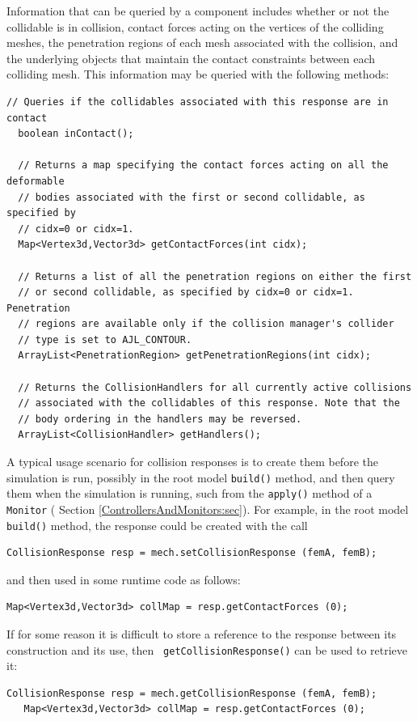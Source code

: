 Information that can be queried by a
 component
includes whether or not the collidable is in collision, contact
forces acting on the vertices of the colliding meshes, the
penetration regions of each mesh associated with the collision, and
the underlying 
objects that maintain the contact constraints between each colliding
mesh. This information may be queried with the following methods:
%
\begin{lstlisting}[]
  // Queries if the collidables associated with this response are in contact
  boolean inContact(); 

  // Returns a map specifying the contact forces acting on all the deformable 
  // bodies associated with the first or second collidable, as specified by
  // cidx=0 or cidx=1.
  Map<Vertex3d,Vector3d> getContactForces(int cidx);

  // Returns a list of all the penetration regions on either the first
  // or second collidable, as specified by cidx=0 or cidx=1. Penetration
  // regions are available only if the collision manager's collider
  // type is set to AJL_CONTOUR.
  ArrayList<PenetrationRegion> getPenetrationRegions(int cidx);

  // Returns the CollisionHandlers for all currently active collisions
  // associated with the collidables of this response. Note that the
  // body ordering in the handlers may be reversed.
  ArrayList<CollisionHandler> getHandlers();
\end{lstlisting}
%

A typical usage scenario for collision responses is to create them
before the simulation is run, possibly in the root model {\tt build()}
method, and then query them when the simulation is running, such from
the {\tt apply()} method of a {\tt Monitor} (
Section \ref{ControllersAndMonitors:sec}). For example,
in the root model {\tt build()} method, the response
could be created with the call
%
\begin{lstlisting}[]
   CollisionResponse resp = mech.setCollisionResponse (femA, femB);
\end{lstlisting}
%
and then used in some runtime code as follows:
%
\begin{lstlisting}[]
   Map<Vertex3d,Vector3d> collMap = resp.getContactForces (0);
\end{lstlisting}
%
If for some reason it is difficult to store a reference to the
response between its construction and its use, then {\tt
getCollisionResponse()} can be used to retrieve it:
%
\begin{lstlisting}[]
   CollisionResponse resp = mech.getCollisionResponse (femA, femB);
   Map<Vertex3d,Vector3d> collMap = resp.getContactForces (0);
\end{lstlisting}
%

